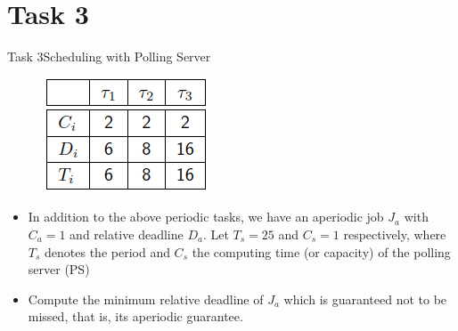 
\section{Task 3}

\setcounter{task}{1}

\begin{frame}{Task 3}{Scheduling with Polling Server}
  \begin{tasknoinc}
    \begin{figure}
       \centering
       \includegraphics[scale=0.8]{figures/periodic_tasks_3.1.PNG}
       \label{fig:my_label}
   \end{figure}
   \begin{itemize}
       \item In addition to the above periodic tasks, we have an aperiodic job $J_a$ with $C_a = 1$ and relative deadline $D_a$. Let $T_s = 25$ and $C_s = 1$ respectively, where $T_s$ denotes the period and $C_s$ the computing time (or capacity) of the polling server (PS)
       \item Compute the minimum relative deadline of $J_a$ which is guaranteed not to be missed, that is, its aperiodic guarantee.
   \end{itemize}
  \end{tasknoinc}
\end{frame}
